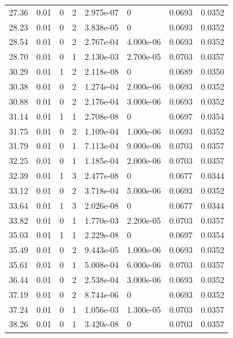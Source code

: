 \documentclass[preview]{standalone}
\begin{document}
{{{\begin{tabular}{L{1.2cm}C{1.2cm} C{0.3cm}C{0.5cm} C{1.4cm}C{1.4cm} C{1.4cm}C{1.4cm}}
  27.36  &  0.01  & 0     &  2 &  2.975e-07  & 0  & 0.0693 &  0.0352   \\ 
  28.23  &  0.01  & 0     &  2 &  3.838e-05  & 0  & 0.0693 &  0.0352   \\ 
  28.54  &  0.01  & 0     &  2 &  2.767e-04  & 4.000e-06  & 0.0693 &  0.0352   \\ 
  28.70  &  0.01  & 0     &  1 &  2.130e-03  & 2.700e-05  & 0.0703 &  0.0357   \\ 
  30.29  &  0.01  & 1     &  2 &  2.118e-08  & 0  & 0.0689 &  0.0350   \\ 
  30.38  &  0.01  & 0     &  2 &  1.274e-04  & 2.000e-06  & 0.0693 &  0.0352   \\ 
  30.88  &  0.01  & 0     &  2 &  2.176e-04  & 3.000e-06  & 0.0693 &  0.0352   \\ 
  31.14  &  0.01  & 1     &  1 &  2.708e-08  & 0  & 0.0697 &  0.0354   \\ 
  31.75  &  0.01  & 0     &  2 &  1.109e-04  & 1.000e-06  & 0.0693 &  0.0352   \\ 
  31.79  &  0.01  & 0     &  1 &  7.113e-04  & 9.000e-06  & 0.0703 &  0.0357   \\ 
  32.25  &  0.01  & 0     &  1 &  1.185e-04  & 2.000e-06  & 0.0703 &  0.0357   \\ 
  32.39  &  0.01  & 1     &  3 &  2.477e-08  & 0  & 0.0677 &  0.0344   \\ 
  33.12  &  0.01  & 0     &  2 &  3.718e-04  & 5.000e-06  & 0.0693 &  0.0352   \\ 
  33.64  &  0.01  & 1     &  3 &  2.026e-08  & 0  & 0.0677 &  0.0344   \\ 
  33.82  &  0.01  & 0     &  1 &  1.770e-03  & 2.200e-05  & 0.0703 &  0.0357   \\ 
  35.03  &  0.01  & 1     &  1 &  2.229e-08  & 0  & 0.0697 &  0.0354   \\ 
  35.49  &  0.01  & 0     &  2 &  9.443e-05  & 1.000e-06  & 0.0693 &  0.0352   \\ 
  35.61  &  0.01  & 0     &  1 &  5.008e-04  & 6.000e-06  & 0.0703 &  0.0357   \\ 
  36.44  &  0.01  & 0     &  2 &  2.538e-04  & 3.000e-06  & 0.0693 &  0.0352   \\ 
  37.19  &  0.01  & 0     &  2 &  8.744e-06  & 0  & 0.0693 &  0.0352   \\ 
  37.24  &  0.01  & 0     &  1 &  1.056e-03  & 1.300e-05  & 0.0703 &  0.0357   \\ 
  38.26  &  0.01  & 0     &  1 &  3.420e-08  & 0  & 0.0703 &  0.0357   \\ 

\end{tabular}}}}
\end{document}
